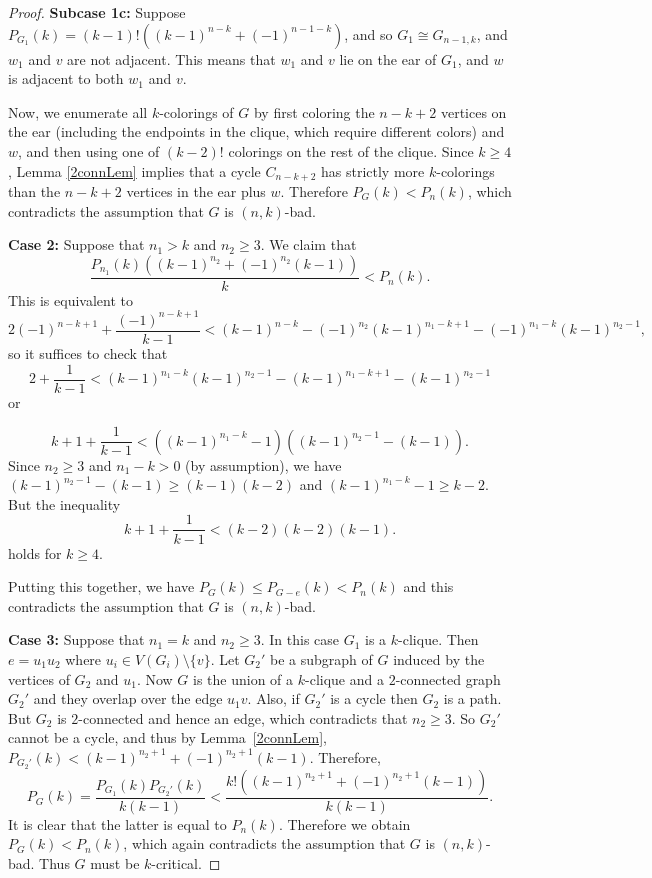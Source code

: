 \documentclass[11pt]{article}
\theoremstyle{plain}
\theoremstyle{definition}
\theoremstyle{remark}
\begin{document}
\begin{proof}
\textbf{Subcase 1c:} Suppose $P_{G_1}(k) = (k-1)!((k-1)^{n-k}+(-1)^{n-1-k})$, and so $G_1\cong G_{n-1,k}$, and $w_1$ and $v$ are not adjacent.  This means that $w_1$ and $v$ lie on the ear of $G_1$, and $w$ is adjacent to both $w_1$ and $v$.

Now, we enumerate all $k$-colorings of $G$ by first coloring the $n-k+2$ vertices on the ear (including the endpoints in the clique, which require different colors) and $w$, and then using one of $(k-2)!$ colorings on the rest of the clique.  Since $k \geq 4$, Lemma \ref{2connLem} implies that a cycle $C_{n-k+2}$ has strictly more $k$-colorings than the $n-k+2$ vertices in the ear plus $w$.  Therefore $P_G(k)<P_n(k)$, which contradicts the assumption that $G$ is $(n,k)$-bad.

\medskip

\textbf{Case 2:} Suppose that $n_1>k$ and $n_2 \geq 3$. We claim that 
$$\frac{P_{n_1}(k)\left((k-1)^{n_2}+(-1)^{n_2}(k-1)\right)}{k}<P_n(k).$$
This is equivalent to
$$2(-1)^{n-k+1}+\frac{(-1)^{n-k+1}}{k-1}<(k-1)^{n-k}-(-1)^{n_2}(k-1)^{n_1-k+1}-(-1)^{n_1-k}(k-1)^{n_2-1},$$
so it suffices to check that 
$$2+\frac{1}{k-1}<(k-1)^{n_1-k}(k-1)^{n_2-1}-(k-1)^{n_1-k+1}-(k-1)^{n_2-1}$$
or

\[
k+1 + \frac{1}{k-1} < \left( (k-1)^{n_1-k} - 1 \right) \left( (k-1)^{n_2-1}-(k-1)\right).
\]
Since $n_2 \geq 3$ and $n_1-k>0$ (by assumption), we have $(k-1)^{n_2-1}-(k-1) \geq (k-1)(k-2)$ and $(k-1)^{n_1-k}-1 \geq k-2$. But the inequality 
\[
k+1+\frac{1}{k-1} < (k-2)(k-2)(k-1).
\]
holds for $k \geq 4$. 

Putting this together, we have $P_G(k)\leq P_{G-e}(k)<P_n(k)$ and this contradicts the assumption that $G$ is $(n,k)$-bad.
 
 \medskip

\textbf{Case 3:} Suppose that $n_1=k$ and $n_2 \geq 3$. In this case $G_1$ is a $k$-clique. Then $e=u_1u_2$ where $u_i\in V(G_i)\setminus \{v\}$. Let $G_2'$ be a subgraph of $G$ induced by the vertices of $G_2$ and $u_1$. Now $G$ is the union of a $k$-clique and a $2$-connected graph $G_2'$ and they overlap over the edge $u_1v$. Also, if $G_2'$ is a cycle then $G_2$ is a path. But $G_2$ is $2$-connected and hence an edge, which contradicts that $n_2 \geq 3$. So $G_2'$ cannot be a cycle, and thus by Lemma~\ref{2connLem}, $P_{G_2'}(k)<(k-1)^{n_2+1}+(-1)^{n_2+1}(k-1)$. Therefore,
$$P_{G}(k)=\frac{P_{G_1}(k)P_{G_2'}(k)}{k(k-1)}< \frac{k!((k-1)^{n_2+1}+(-1)^{n_2+1}(k-1))}{k(k-1)}.$$
It is clear that the latter is equal to $P_n(k)$.
Therefore we obtain $P_G(k)<P_n(k)$, which again contradicts the assumption that $G$ is $(n,k)$-bad. 
Thus $G$ must be $k$-critical.
\end{proof}
\end{document}
